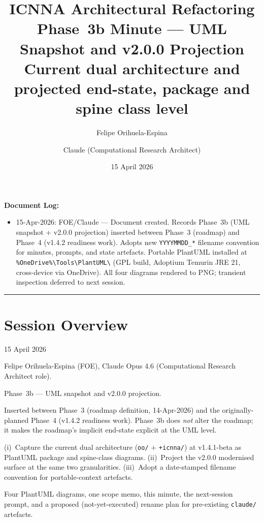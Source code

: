 \documentclass[11pt,a4paper]{article}
\title{ICNNA Architectural Refactoring\\Phase~3b Minute --- UML Snapshot and v2.0.0 Projection\\
\large Current dual architecture and projected end-state, package and spine class level}
\author{Felipe Orihuela-Espina \and Claude (Computational Research Architect)}
\date{15 April 2026}
\begin{document}
\maketitle

\noindent\textbf{Document Log:}
\begin{itemize}[nosep]
    \item 15-Apr-2026: FOE/Claude --- Document created. Records Phase~3b (UML snapshot + v2.0.0 projection) inserted between Phase~3 (roadmap) and Phase~4 (v1.4.2 readiness work). Adopts new \texttt{YYYYMMDD\_*} filename convention for minutes, prompts, and state artefacts. Portable PlantUML installed at \texttt{\%OneDrive\%\textbackslash Tools\textbackslash PlantUML\textbackslash} (GPL build, Adoptium Temurin JRE 21, cross-device via OneDrive). All four diagrams rendered to PNG; transient inspection deferred to next session.
\end{itemize}

\vspace{1em}
\hrule
\vspace{1em}

\section{Session Overview}

\begin{description}[style=nextline]
    \item[Date:] 15 April 2026
    \item[Participants:] Felipe Orihuela-Espina (FOE), Claude Opus 4.6 (Computational Research Architect role).
    \item[Phase:] Phase~3b --- UML snapshot and v2.0.0 projection.
    \item[Position in series:] Inserted between Phase~3 (roadmap definition, 14-Apr-2026) and the originally-planned Phase~4 (v1.4.2 readiness work). Phase~3b does \emph{not} alter the roadmap; it makes the roadmap's implicit end-state explicit at the UML level.
    \item[Objective:] (i)~Capture the current dual architecture (\texttt{oo/} + \texttt{+icnna/}) at v1.4.1-beta as PlantUML package and spine-class diagrams. (ii)~Project the v2.0.0 modernised surface at the same two granularities. (iii)~Adopt a date-stamped filename convention for portable-context artefacts.
    \item[Outcome:] Four PlantUML diagrams, one scope memo, this minute, the next-session prompt, and a proposed (not-yet-executed) rename plan for pre-existing \texttt{claude/} artefacts.
\end{description}
\end{document}
